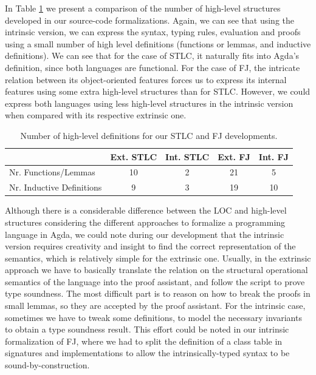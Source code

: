 \documentclass[tese,capa,english]{texufpel}
\begin{document}
In Table \ref{tab:nrfun} we present a comparison of the number of high-level structures developed in our source-code formalizations. Again, we can see that using the intrinsic version, we can express the syntax, typing rules, evaluation and proofs using a small number of high level definitions (functions or lemmas, and inductive definitions). We can see that for the case of STLC, it naturally fits into Agda's definition, since both languages are functional. For the case of FJ, the intricate relation between its object-oriented features forces us to express its internal features using some extra high-level structures than for STLC. However, we could express both languages using less high-level structures in the intrinsic version when compared with its respective extrinsic one.

\begin{table}[!htb]
\begin{center}
\begin{tabular}{lcccc}
\hline
                          & Ext. STLC & Int. STLC & Ext. FJ & Int. FJ \\ \hline
Nr. Functions/Lemmas      & 10        & 2         & 21      & 5       \\
Nr. Inductive Definitions & 9         & 3         & 19      & 10      \\ \hline
\end{tabular}
\caption{Number of high-level definitions for our STLC and FJ developments.}
\label{tab:nrfun}
\end{center}
\end{table}

\vspace{-3ex}

Although there is a considerable difference between the LOC and high-level structures considering the different approaches to formalize a programming language in Agda, we could note during our development that the intrinsic version requires creativity and insight to find the correct representation of the semantics, which is relatively simple for the extrinsic one. Usually, in the extrinsic approach we have to basically translate the relation on the structural operational semantics of the language into the proof assistant, and follow the script to prove type soundness. The most difficult part is to reason on how to break the proofs in small lemmas, so they are accepted by the proof assistant. For the intrinsic case, sometimes we have to tweak some definitions, to model the necessary invariants to obtain a type soundness result. This effort could be noted in our intrinsic formalization of FJ, where we had to split the definition of a class table in signatures and implementations to allow the intrinsically-typed syntax to be sound-by-construction.
\end{document}
